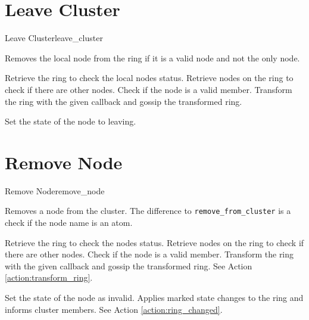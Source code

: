 \section{Leave Cluster}
\begin{actionbox}{Leave Cluster}{leave_cluster}
	\begin{action}
		 Removes the local node from the ring if it is a valid node and not the only node.
		\begin{action}
			 Retrieve the ring to check the local nodes status.
			 Retrieve nodes on the ring to check if there are other nodes.
			 Check if the node is a valid member.
			 Transform the ring with the given callback and gossip the transformed ring.
			\begin{action}
				 Set the state of the node to leaving.
			\end{action}
		\end{action}
	\end{action}
\end{actionbox}

\section{Remove Node}
\begin{actionbox}{Remove Node}{remove_node}
	\begin{action}
		 Removes a node from the cluster.
		The difference to  \lstinline!remove_from_cluster! is a check if the node name is an atom.
		\begin{action}
			 Retrieve the ring to check the nodes status.
			 Retrieve nodes on the ring to check if there are other nodes.
			 Check if the node is a valid member.
			Transform the ring with the given callback and gossip the transformed ring.
			See Action \ref{action:transform_ring}.
			\begin{action}
				 Set the state of the node as invalid.
				 Applies marked state changes to the ring and informs cluster members.
				See Action \ref{action:ring_changed}.
			\end{action}
		\end{action}
	\end{action}
\end{actionbox}

